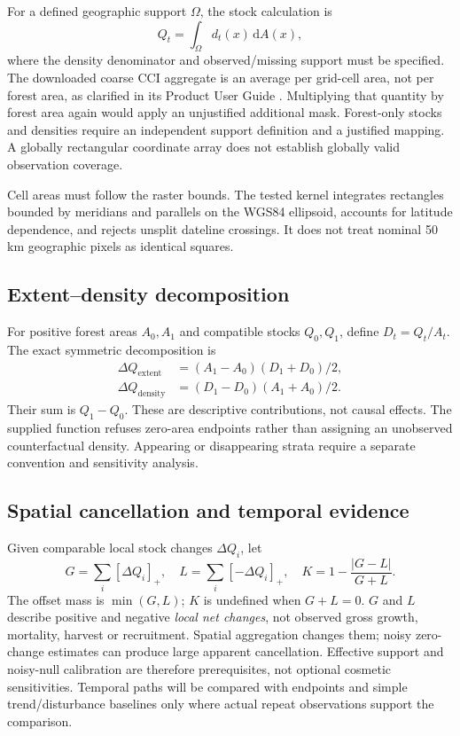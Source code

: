 \documentclass[11pt,a4paper]{article}
\begin{document}
For a defined geographic support $\Omega$, the stock calculation is
\[
Q_t=\int_{\Omega} d_t(x)\,\mathrm d A(x),
\]
where the density denominator and observed/missing support must be specified. The downloaded coarse CCI aggregate is an average per grid-cell area, not per forest area, as clarified in its Product User Guide \citep{PUG2026}. Multiplying that quantity by forest area again would apply an unjustified additional mask. Forest-only stocks and densities require an independent support definition and a justified mapping. A globally rectangular coordinate array does not establish globally valid observation coverage.

Cell areas must follow the raster bounds. The tested kernel integrates rectangles bounded by meridians and parallels on the WGS84 ellipsoid, accounts for latitude dependence, and rejects unsplit dateline crossings. It does not treat nominal 50 km geographic pixels as identical squares.

\subsection{Extent--density decomposition}
For positive forest areas $A_0,A_1$ and compatible stocks $Q_0,Q_1$, define $D_t=Q_t/A_t$. The exact symmetric decomposition is
\begin{align*}
\Delta Q_{\mathrm{extent}}&=(A_1-A_0)(D_1+D_0)/2,\\
\Delta Q_{\mathrm{density}}&=(D_1-D_0)(A_1+A_0)/2.
\end{align*}
Their sum is $Q_1-Q_0$. These are descriptive contributions, not causal effects. The supplied function refuses zero-area endpoints rather than assigning an unobserved counterfactual density. Appearing or disappearing strata require a separate convention and sensitivity analysis.

\subsection{Spatial cancellation and temporal evidence}
Given comparable local stock changes $\Delta Q_i$, let
\[
G=\sum_i[\Delta Q_i]_+,\quad L=\sum_i[-\Delta Q_i]_+,\quad
K=1-\frac{|G-L|}{G+L}.
\]
The offset mass is $\min(G,L)$; $K$ is undefined when $G+L=0$. $G$ and $L$ describe positive and negative \emph{local net changes}, not observed gross growth, mortality, harvest or recruitment. Spatial aggregation changes them; noisy zero-change estimates can produce large apparent cancellation. Effective support and noisy-null calibration are therefore prerequisites, not optional cosmetic sensitivities. Temporal paths will be compared with endpoints and simple trend/disturbance baselines only where actual repeat observations support the comparison.
\end{document}
